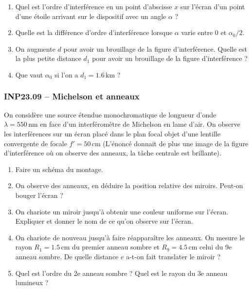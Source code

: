 \begin{center}
\end{center}

\begin{enumerate}
\item Quel est l'ordre d'interférence en un point d'abscisse $x$ sur l'écran d'un point d'une étoile arrivant sur le dispositif avec un angle $\alpha$ ?
\item Quelle est la différence d'ordre d'interférence lorsque $\alpha$ varie entre $0$ et $\alpha_{0}/2$.
\item On augmente $d$ pour avoir un brouillage de la figure d'interférence. Quelle est la plus petite distance $d_{1}$ pour avoir un brouillage de la figure d'interférence ?
\item Que vaut $\alpha_{0}$ si l'on a $d_{1} = 1.6\,\text{km}$ ?
\end{enumerate}

\subsubsection*{INP23.09 -- Michelson et anneaux }

On considère une source étendue monochromatique de longueur d'onde $\lambda = 550\,\text{nm}$ en face d'un interféromètre de Michelson en lame d'air. On observe les interférences sur un écran placé dans le plan focal objet d'une lentille convergente de focale $f' = 50\,\text{cm}$ (L'énoncé donnait de plus une image de la figure d'interférence où on observe des anneaux, la tâche centrale est brillante).

\begin{enumerate}
\item Faire un schéma du montage.
\item On observe des anneaux, en déduire la position relative des miroirs. Peut-on bouger l'écran ?
\item On chariote un miroir jusqu'à obtenir une couleur uniforme sur l'écran. Expliquer et donner le nom de ce qu'on observe sur l'écran.
\item On chariote de nouveau jusqu'à faire réapparaître les anneaux. On mesure le rayon $R_{1} = 1.5\,\text{cm}$ du premier anneau sombre et $R_{9} = 4.5\,\text{cm}$ celui du 9e anneau sombre. De quelle distance $e$ a-t-on fait translater le miroir ?
\item Quel est l'ordre du 2e anneau sombre ? Quel est le rayon du 3e anneau lumineux ?
\end{enumerate}
\newpage
